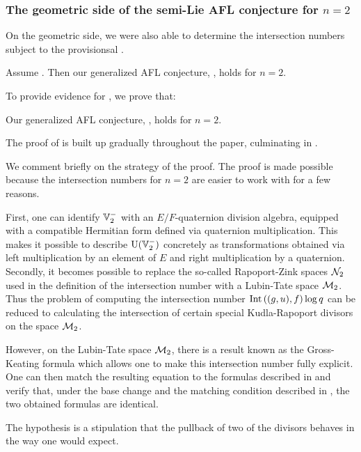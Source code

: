 \subsubsection{The geometric side of the semi-Lie AFL conjecture for $n=2$}
\ifthesis
On the geometric side, we were also able to determine the intersection numbers
subject to the provisionsal .
\begin{theorem}
  [Semi-Lie AFL for the full Hecke algebra for $n=2$]
  \label{thm:semi_lie_n_equals_2}
  Assume .
  Then our generalized AFL conjecture, , holds for $n = 2$.
\end{theorem}
\fi
\ifpaper
To provide evidence for , we prove that:
\begin{theorem}
  [Semi-Lie AFL for the full Hecke algebra for $n=2$]
  \label{thm:semi_lie_n_equals_2}
  Our generalized AFL conjecture, , holds for $n = 2$.
\end{theorem}
\fi

The proof of  is built up gradually
throughout the paper, culminating in .

We comment briefly on the strategy of the proof.
The proof is made possible because the intersection numbers for $n=2$
are easier to work with for a few reasons.
\begin{itemize}
\ii First, one can identify $\mathbb V_2^-$ with an $E/F$-quaternion division algebra,
equipped with a compatible Hermitian form defined via quaternion multiplication.
This makes it possible to describe $\operatorname{U}(\mathbb V_2^-)$ concretely as transformations obtained
via left multiplication by an element of $E$ and right multiplication by a quaternion.
\ii Secondly, it becomes possible to replace the so-called Rapoport-Zink spaces $\mathcal N_2$
used in the definition of the intersection number with a Lubin-Tate space $\mathcal M_2$.
Thus the problem of computing the intersection number
$\operatorname{Int}\left( (g,u), f \right) \log q$
can be reduced to calculating the intersection of certain special
Kudla-Rapoport divisors on the space $\mathcal M_2$.

However, on the Lubin-Tate space $\mathcal M_2$,
there is a result known as the Gross-Keating formula \cite{ref:GK}
which allows one to make this intersection number fully explicit.
One can then match the resulting equation to the formulas described in
and verify that, under the base change 
and the matching condition described in ,
the two obtained formulas are identical.
\end{itemize}
\ifthesis
The hypothesis 
is a stipulation that the pullback of two of the divisors
behaves in the way one would expect.
\fi

